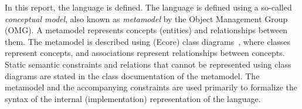 
In this report, the \ecorelang{} language is defined. The \ecorelang{}
language is defined using a so-called \emph{conceptual model}, also known as
\emph{metamodel} by the Object Management Group (OMG). A metamodel represents
concepts (entities) and relationships between them. The \ecorelang{} metamodel
is described using (Ecore) class diagrams~\cite{Steinberg4:EMFBook09}, where
classes represent concepts, and associations represent relationships between
concepts. Static semantic constraints and relations that cannot be represented
using class diagrams are stated in the class documentation of the metamodel.
The metamodel and the accompanying constraints are used primarily to formalize
the syntax of the internal (implementation) representation of the language.

